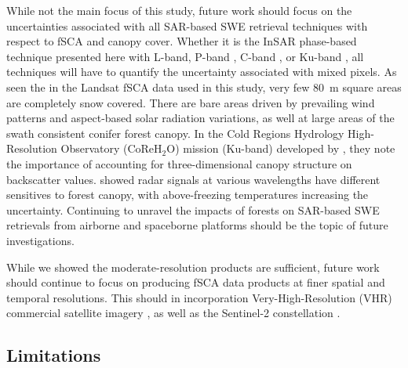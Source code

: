 While not the main focus of this study, future work should focus on the uncertainties associated with all SAR-based SWE retrieval techniques with respect to fSCA and canopy cover. Whether it is the InSAR phase-based technique presented here with L-band, P-band \citep{shahRemoteSensingSnow2017,maEstimatingSpatiotemporallyContinuous2023}, C-band \citep{lievensSnowDepthVariability2019,oveisgharanSnowWaterEquivalent2023}, or Ku-band \citep{tsangReviewArticleGlobal2022,rottColdRegionsHydrology2010}, all techniques will have to quantify the uncertainty associated with mixed pixels. As seen the in the Landsat fSCA data used in this study, very few 80~m square areas are completely snow covered. There are bare areas driven by prevailing wind patterns and aspect-based solar radiation variations, as well at large areas of the swath consistent conifer forest canopy. In the Cold Regions Hydrology High-Resolution Observatory (CoReH$_{2}$O) mission (Ku-band) developed by \cite{rottColdRegionsHydrology2010}, they note the importance of accounting for three-dimensional canopy structure on backscatter values. \cite{lemmetyinenAttenuationRadarSignal2022} showed radar signals at various wavelengths have different sensitives to forest canopy, with above-freezing temperatures increasing the uncertainty. Continuing to unravel the impacts of forests on SAR-based SWE retrievals from airborne and spaceborne platforms should be the topic of future investigations.

While we showed the moderate-resolution products are sufficient, future work should continue to focus on producing fSCA data products at finer spatial and temporal resolutions. This should in incorporation Very-High-Resolution (VHR) commercial satellite imagery \citep{huImprovingMountainSnow2022, thalerEstimatingSnowCover2023,yangHighresolutionMappingSnow2023,johnHighResolutionSnowCoveredArea2022}, as well as the Sentinel-2 constellation \citep{gascoinEstimatingFractionalSnow2020}.

\hypertarget{ch5-discussion-2}{\subsection{Limitations}\label{ch4-discussion-2}}

